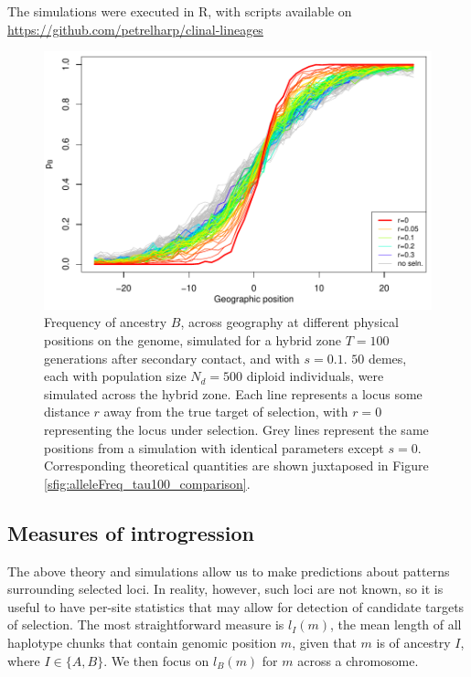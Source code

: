 \documentclass[11pt,letterpaper]{article}
\begin{document}
The simulations were executed in R, with scripts available on
\url{https://github.com/petrelharp/clinal-lineages}

\begin{figure}
\includegraphics{figs/alleleFrequencies_sim}
\caption{
    Frequency of ancestry $B$,
    across geography at different physical positions on the genome, simulated for a hybrid zone
     $T=100$ generations after secondary contact,
    and with $s=0.1$.
        $50$ demes, each with population size $N_d=500$ diploid individuals, were simulated across the hybrid zone.
    Each line represents a locus some distance $r$ away from the true target of selection, 
with $r=0$ representing the locus under selection. Grey lines represent the same positions from a simulation with
    identical parameters except $s=0$.
    Corresponding theoretical quantities are shown juxtaposed in Figure \ref{sfig:alleleFreq_tau100_comparison}.
}\label{alleleFreq_tau100}
\end{figure}

\subsection*{Measures of introgression}


The above theory and simulations allow us to make predictions about patterns surrounding selected loci. In reality, however, such loci are not known, so it is useful to have per-site statistics that may allow for detection of candidate targets of selection. The most straightforward measure is $l_I(m)$,  the mean length of all haplotype chunks that contain genomic position $m$, given that $m$ is of ancestry $I$, where $I\in\{A,B\}$.
We then focus on $l_B(m)$ for $m$ across a chromosome. 
\end{document}
